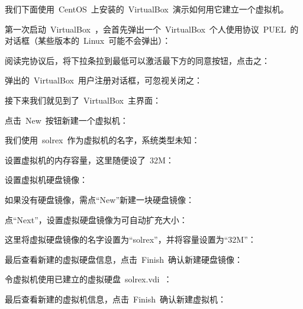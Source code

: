 我们下面使用~CentOS~上安装的~VirtualBox~演示如何用它建立一个虚拟机。

第一次启动~VirtualBox~，会首先弹出一个~VirtualBox~个人使用协议~PUEL~的对话框（某些版本的~Linux~可能不会弹出）：\\

阅读完协议后，将下拉条拉到最低可以激活最下方的同意按钮，点击之：\\

弹出的~VirtualBox~用户注册对话框，可忽视关闭之：\\

接下来我们就见到了~VirtualBox~主界面：\\

点击~New~按钮新建一个虚拟机：\\

我们使用~solrex~作为虚拟机的名字，系统类型未知：\\

设置虚拟机的内存容量，这里随便设了~32M：\\

设置虚拟机硬盘镜像：\\

如果没有硬盘镜像，需点“New”新建一块硬盘镜像：\\

点“Next”，设置虚拟硬盘镜像为可自动扩充大小：\\

这里将虚拟硬盘镜像的名字设置为“solrex”，并将容量设置为“32M”：\\

最后查看新建的虚拟硬盘信息，点击~Finish~确认新建硬盘镜像：\\

令虚拟机使用已建立的虚拟硬盘~solrex.vdi~：\\

最后查看新建的虚拟机信息，点击~Finish~确认新建虚拟机：\\

